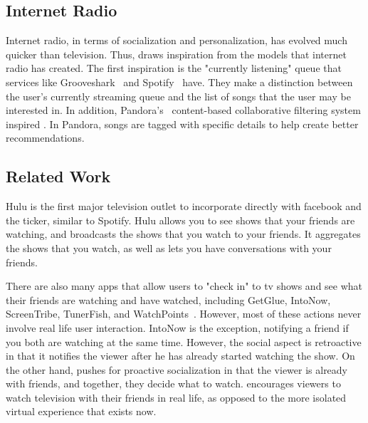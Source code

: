 \subsection{Internet Radio}
Internet radio, in terms of socialization and personalization, has
evolved much quicker than television.  Thus, {\sys} draws inspiration
from the models that internet radio has created.  The first
inspiration is the "currently listening" queue that services like
Grooveshark~\cite{grooveshark} and Spotify~\cite{spotify} have.  They
make a distinction between the user’s currently streaming queue and
the list of songs that the user may be interested in.  In addition,
Pandora’s~\cite{pandora} content-based collaborative filtering system
inspired {\sys}.  In Pandora, songs are tagged with specific details
to help create better recommendations.

\subsection{Related Work}
Hulu is the first major television outlet to incorporate directly with
facebook and the ticker, similar to Spotify.  Hulu allows you to see
shows that your friends are watching, and broadcasts the shows that
you watch to your friends.  It aggregates the shows that you watch, as
well as lets you have conversations with your friends.

There are also many apps that allow users to "check in" to tv shows
and see what their friends are watching and have watched, including
GetGlue, IntoNow, ScreenTribe, TunerFish, and WatchPoints~\cite{chausse}.  
However, most of these actions never involve real life user
interaction.  IntoNow is the exception, notifying a friend if you both are watching at
the same time.  However, the social aspect is retroactive in that it notifies
the viewer after he has already started watching the show.  On the other hand, {\sys} pushes for proactive
socialization in that the viewer is already with friends, and together, they decide what to watch.  {\sys} encourages viewers to watch television with their friends in real life, as opposed to the more isolated virtual experience that exists now.
